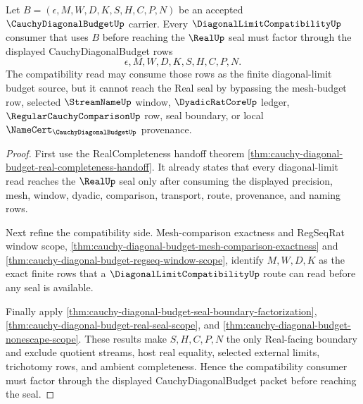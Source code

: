 \begin{theorem}
\label{thm:cauchy-diagonal-budget-diagonal-limit-consumer-scope}
Let $B=(\epsilon,M,W,D,K,S,H,C,P,N)$ be an accepted $\CauchyDiagonalBudgetUp$ carrier. Every $\DiagonalLimitCompatibilityUp$ consumer that uses $B$ before reaching the $\RealUp$ seal must factor through the displayed CauchyDiagonalBudget rows
$$
\epsilon,M,W,D,K,S,H,C,P,N.
$$
The compatibility read may consume those rows as the finite diagonal-limit budget source, but it cannot reach the Real seal by bypassing the mesh-budget row, selected $\StreamNameUp$ window, $\DyadicRatCoreUp$ ledger, $\RegularCauchyComparisonUp$ row, seal boundary, or local $\NameCert_{\CauchyDiagonalBudgetUp}$ provenance.
\end{theorem}
\begin{proof}
First use the RealCompleteness handoff theorem \autoref{thm:cauchy-diagonal-budget-real-completeness-handoff}. It already states that every diagonal-limit read reaches the $\RealUp$ seal only after consuming the displayed precision, mesh, window, dyadic, comparison, transport, route, provenance, and naming rows.

Next refine the compatibility side. Mesh-comparison exactness and RegSeqRat window scope, \autoref{thm:cauchy-diagonal-budget-mesh-comparison-exactness} and \autoref{thm:cauchy-diagonal-budget-regseq-window-scope}, identify $M,W,D,K$ as the exact finite rows that a $\DiagonalLimitCompatibilityUp$ route can read before any seal is available.

Finally apply \autoref{thm:cauchy-diagonal-budget-seal-boundary-factorization}, \autoref{thm:cauchy-diagonal-budget-real-seal-scope}, and \autoref{thm:cauchy-diagonal-budget-nonescape-scope}. These results make $S,H,C,P,N$ the only Real-facing boundary and exclude quotient streams, host real equality, selected external limits, trichotomy rows, and ambient completeness. Hence the compatibility consumer must factor through the displayed CauchyDiagonalBudget packet before reaching the seal.
\end{proof}

